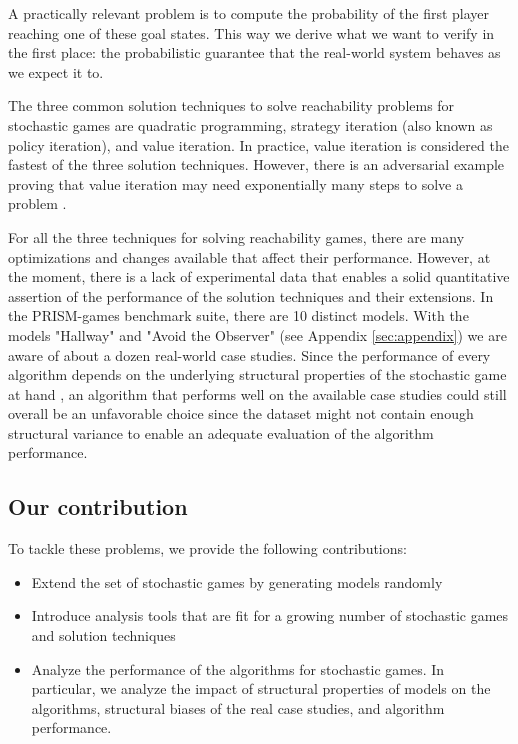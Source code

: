 A practically relevant problem is to compute the probability of the first player reaching one of these goal states. 
This way we derive what we want to verify in the first place: 
the probabilistic guarantee that the real-world system behaves as we expect it to.

The three common solution techniques to solve reachability problems for stochastic games are quadratic programming, 
strategy iteration (also known as policy iteration), and value iteration.
In practice, value iteration is considered the fastest of the three solution techniques.
However, there is an adversarial example proving that value iteration may need exponentially many steps to solve a problem \cite{viExponential}.


For all the three techniques for solving reachability games, there are many optimizations and changes available that affect their performance.
However, at the moment, there is a lack of experimental data that enables a solid quantitative assertion of the performance of the solution techniques and their extensions.
In the PRISM-games benchmark suite, there are 10 distinct models. 
With the models "Hallway" and "Avoid the Observer" (see Appendix \ref{sec:appendix}) we are aware of about a dozen real-world case studies.
Since the performance of every algorithm depends on the underlying structural properties of the stochastic game at hand \cite{gandalf}, 
an algorithm that performs well on the available case studies could still overall be an unfavorable choice since the dataset might not contain enough
structural variance to enable an adequate evaluation of the algorithm performance.

\subsection*{Our contribution}
To tackle these problems, we provide the following contributions:
\begin{itemize}
    \item Extend the set of stochastic games by generating models randomly
    \item Introduce analysis tools that are fit for a growing number of stochastic games and solution techniques
    \item Analyze the performance of the algorithms for stochastic games. 
        In particular, we analyze the impact of structural properties of models on the algorithms, structural biases of the real case studies, and algorithm performance.
\end{itemize}

